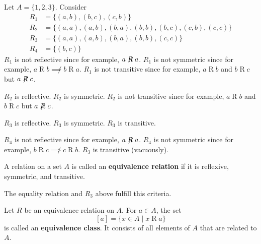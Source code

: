 \documentclass{article}
\begin{document}
  \begin{examples}
    Let $A = \{1, 2, 3\}$. Consider
    \begin{align*}
      R_1 &= \{(a,b), (b, c), (c, b)\}\\
      R_2 &= \{(a, a), (a, b), (b, a), (b, b), (b, c), (c, b), (c, c)\}\\
      R_3 &= \{(a, a), (a, b), (b, a), (b, b), (c, c)\}\\
      R_4 &= \{(b, c)\}
    \end{align*}
    $R_1$ is not reflective since for example, $a \not \mathrel{R} a$.
    $R_1$ is not symmetric since for example, $a \mathrel{R} b \not \implies b \mathrel{R} a$.
    $R_1$ is not transitive since for example, $a \mathrel{R} b$ and $b \mathrel{R} c$ but $a \not \mathrel{R} c$.

    $R_2$ is reflective.
    $R_2$ is symmetric.
    $R_2$ is not transitive since for example, $a \mathrel{R} b$ and $b \mathrel{R} c$ but $a \not \mathrel{R} c$.

    $R_3$ is reflective.
    $R_3$ is symmetric.
    $R_3$ is transitive.

    $R_4$ is not reflective since for example, $a \not \mathrel{R} a$.
    $R_4$ is not symmetric since for example, $b \mathrel{R} c \not \implies c \mathrel{R} b$.
    $R_3$ is transitive (vacuously).
  \end{examples}
  \begin{definition}
    A relation on a set $A$ is called an \textbf{equivalence relation} if it is reflexive, symmetric, and transitive.

    The equality relation and $R_3$ above fulfill this criteria.
  \end{definition}
  \begin{definition}
    Let $R$ be an equivalence relation on $A$. For $a \in A$, the set
    \[
      [a] = \{x \in A \mid x \mathrel{R} a\}
    \]
    is called an \textbf{equivalence class}. It consists of all elements of $A$ that are related to $A$.
  \end{definition}
\end{document}
